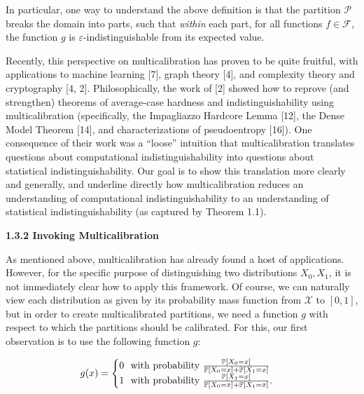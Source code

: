 


In particular, one way to understand the above definition is that the partition $\mathcal{P}$ breaks the domain into parts, such that \emph{within} each part, for all functions $f\in\mathcal{F}$, the function $g$ is $\varepsilon$-indistinguishable from its expected value.\par




Recently, this perspective on multicalibration has proven to be quite fruitful, with applications to machine learning [7], graph theory [4], and complexity theory and cryptography [4, 2]. Philosophically, the work of [2] showed how to reprove (and strengthen) theorems of average-case hardness and indistinguishability using multicalibration (specifically, the Impagliazzo Hardcore Lemma [12], the Dense Model Theorem [14], and characterizations of pseudoentropy [16]). One consequence of their work was a “loose” intuition that multicalibration translates questions about computational indistinguishability into questions about statistical indistinguishability.
Our goal is to show this translation more clearly and generally, and underline directly how multicalibration reduces an understanding of computational indistinguishability to an understanding of statistical indistinguishability (as captured by Theorem 1.1).\par





\par\medskip\noindent\textbf{
1.3.2 Invoking Multicalibration}\par




As mentioned above, multicalibration has already found a host of applications. However, for the specific purpose of distinguishing two distributions $X_{0},X_{1}$, it is not immediately clear how to apply this framework. Of course, we can naturally view each distribution as given by its probability mass function from $\mathcal{X}$ to $[0,1]$, but in order to create multicalibrated partitions, we need a function $g$ with respect to which the partitions should be calibrated. For this, our first observation is to use the following function $g$:\par


\[\begin{gathered}
g(x)=\begin{cases}0\nobreak\ \nobreak\ \text{with probability }\frac{\mathbb{P}[X_{0}=x]}{\mathbb{P}[X_{0}=x]+\mathbb{P}[X_{1}=x]}\\
1\nobreak\ \nobreak\ \text{with probability }\frac{\mathbb{P}[X_{1}=x]}{\mathbb{P}[X_{0}=x]+\mathbb{P}[X_{1}=x]}.\end{cases}
\end{gathered}\]




